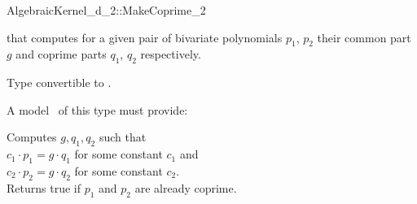 \begin{ccRefConcept}{AlgebraicKernel_d_2::MakeCoprime_2}

\ccDefinition

 that computes for a given pair of 
bivariate polynomials $p_1$, $p_2$ their common part $g$ and 
coprime parts $q_1$, $q_2$ respectively.


        { Type convertible to .}


A model \ccVar\ of this type must provide:

{ Computes $g, q_1, q_2$ such that\\
$c_1 \cdot p_1 =  g \cdot q_1$ for some constant $c_1$ and\\
$c_2 \cdot p_2 =  g \cdot q_2$ for some constant $c_2$.\\
Returns true if $p_1$ and $p_2$ are already coprime. 
}

\ccSeeAlso

\end{ccRefConcept}
